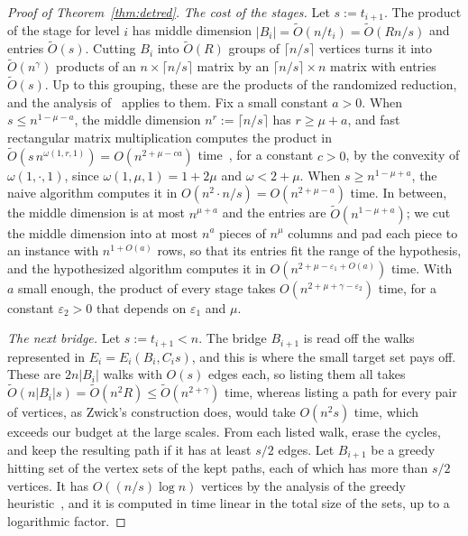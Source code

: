 \begin{proof}[Proof of Theorem~\ref{thm:detred}]
\emph{The cost of the stages.} Let $s:=t_{i+1}$. The product of the stage for level $i$ has middle dimension $|B_i|=\tilde O(n/t_i)=\tilde O(Rn/s)$ and entries $\tilde O(s)$. Cutting $B_i$ into $\tilde O(R)$ groups of $\lceil n/s\rceil$ vertices turns it into $\tilde O(n^{\gamma})$ products of an $n\times\lceil n/s\rceil$ matrix by an $\lceil n/s\rceil\times n$ matrix with entries $\tilde O(s)$. Up to this grouping, these are the products of the randomized reduction, and the analysis of~\cite[Theorem~3.1]{CVX21} applies to them. Fix a small constant $a>0$. When $s\le n^{1-\mu-a}$, the middle dimension $n^{r}:=\lceil n/s\rceil$ has $r\ge\mu+a$, and fast rectangular matrix multiplication computes the product in $\tilde O(s\,n^{\omega(1,r,1)})=O(n^{2+\mu-ca})$ time~\cite[Lemma~3.3]{Zwi02}, for a constant $c>0$, by the convexity of $\omega(1,\cdot,1)$, since $\omega(1,\mu,1)=1+2\mu$ and $\omega<2+\mu$. When $s\ge n^{1-\mu+a}$, the naive algorithm computes it in $O(n^{2}\cdot n/s)=O(n^{2+\mu-a})$ time. In between, the middle dimension is at most $n^{\mu+a}$ and the entries are $\tilde O(n^{1-\mu+a})$; we cut the middle dimension into at most $n^{a}$ pieces of $n^{\mu}$ columns and pad each piece to an instance with $n^{1+O(a)}$ rows, so that its entries fit the range of the hypothesis, and the hypothesized algorithm computes it in $O(n^{2+\mu-\varepsilon_1+O(a)})$ time. With $a$ small enough, the product of every stage takes $O(n^{2+\mu+\gamma-\varepsilon_2})$ time, for a constant $\varepsilon_2>0$ that depends on $\varepsilon_1$ and $\mu$.

\emph{The next bridge.} Let $s:=t_{i+1}<n$. The bridge $B_{i+1}$ is read off the walks represented in $E_i=E_i(B_i,C_is)$, and this is where the small target set pays off. These are $2n|B_i|$ walks with $O(s)$ edges each, so listing them all takes $\tilde O(n|B_i|s)=\tilde O(n^{2}R)\leq \tilde O(n^{2+\gamma})$ time, whereas listing a path for every pair of vertices, as Zwick's construction does, would take $O(n^{2}s)$ time, which exceeds our budget at the large scales. From each listed walk, erase the cycles, and keep the resulting path if it has at least $s/2$ edges. Let $B_{i+1}$ be a greedy hitting set of the vertex sets of the kept paths, each of which has more than $s/2$ vertices. It has $O((n/s)\log n)$ vertices by the analysis of the greedy heuristic~\cite{Lov75,Chv79}, and it is computed in time linear in the total size of the sets, up to a logarithmic factor.


\end{proof}
